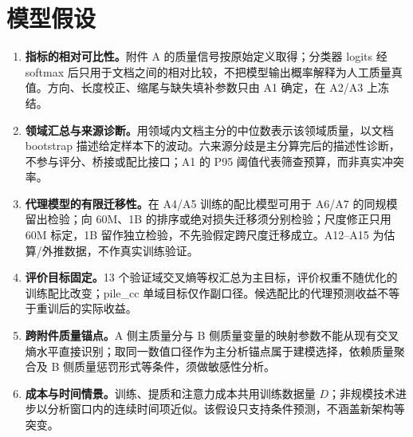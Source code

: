 \section{模型假设}
\begin{enumerate}[label=\arabic*.]
  \item \textbf{指标的相对可比性。}附件 A 的质量信号按原始定义取得；分类器 logits 经 softmax 后只用于文档之间的相对比较，不把模型输出概率解释为人工质量真值。方向、长度校正、缩尾与缺失填补参数只由 A1 确定，在 A2/A3 上冻结。
  \item \textbf{领域汇总与来源诊断。}用领域内文档主分的中位数表示该领域质量，以文档 bootstrap 描述给定样本下的波动。六来源分歧是主分算完后的描述性诊断，不参与评分、桥接或配比接口；A1 的 P95 阈值代表筛查预算，而非真实冲突率。
  \item \textbf{代理模型的有限迁移性。}在 A4/A5 训练的配比模型可用于 A6/A7 的同规模留出检验；向 60M、1B 的排序或绝对损失迁移须分别检验；尺度修正只用 60M 标定，1B 留作独立检验，不先验假定跨尺度迁移成立。A12--A15 为估算/外推数据，不作真实训练验证。
  \item \textbf{评价目标固定。}13 个验证域交叉熵等权汇总为主目标，评价权重不随优化的训练配比改变；pile\_cc 单域目标仅作副口径。候选配比的代理预测收益不等于重训后的实际收益。
  \item \textbf{跨附件质量锚点。}A 侧主质量分与 B 侧质量变量的映射参数不能从现有交叉熵水平直接识别；取同一数值口径作为主分析锚点属于建模选择，依赖质量聚合及 B 侧质量惩罚形式等条件，须做敏感性分析。
  \item \textbf{成本与时间情景。}训练、提质和注意力成本共用训练数据量 $D$；非规模技术进步以分析窗口内的连续时间项近似。该假设只支持条件预测，不涵盖新架构等突变。
\end{enumerate}
